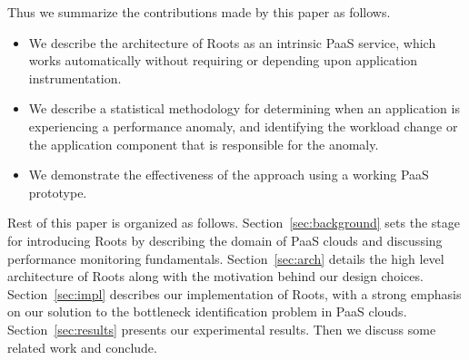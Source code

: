 Thus we summarize the contributions made by this paper as follows.
\begin{itemize}
\item We describe the architecture of Roots as an intrinsic PaaS
service, which works automatically without requiring or depending upon
application instrumentation.
\item We describe a statistical methodology for determining when an
application is experiencing a performance anomaly, and identifying the 
workload change or the application component that is responsible for the anomaly.
\item We demonstrate the effectiveness of the approach using a working PaaS
prototype.
\end{itemize}

Rest of this paper is organized as follows.
Section~\ref{sec:background} sets the stage for introducing Roots by describing the domain of 
PaaS clouds and discussing performance monitoring fundamentals. Section~\ref{sec:arch} 
details the high level architecture of Roots along with the motivation behind our design choices.
Section~\ref{sec:impl} describes our implementation of Roots, with a strong emphasis on our
solution to the bottleneck identification problem in PaaS clouds. Section~\ref{sec:results} presents our
experimental results. Then we discuss some related work and conclude. 
